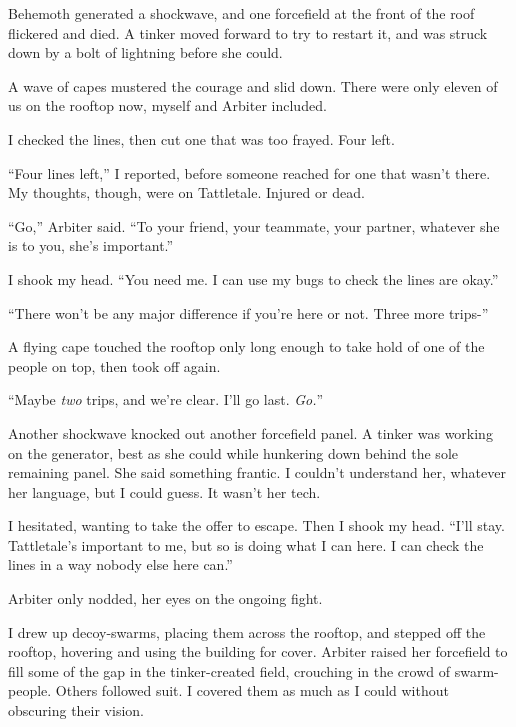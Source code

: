 Behemoth generated a shockwave, and one forcefield at the front of the roof flickered and died.  A tinker moved forward to try to restart it, and was struck down by a bolt of lightning before she could.



A wave of capes mustered the courage and slid down.  There were only eleven of us on the rooftop now, myself and Arbiter included.



I checked the lines, then cut one that was too frayed.  Four left.



``Four lines left,'' I reported, before someone reached for one that wasn't there.  My thoughts, though, were on Tattletale.  Injured or dead.



``Go,'' Arbiter said.  ``To your friend, your teammate, your partner, whatever she is to you, she's important.''



I shook my head.  ``You need me.  I can use my bugs to check the lines are okay.''



``There won't be any major difference if you're here or not.  Three more trips-''



A flying cape touched the rooftop only long enough to take hold of one of the people on top, then took off again.



``Maybe \emph{two }trips, and we're clear.  I'll go last.  \emph{Go}\emph{.}''



Another shockwave knocked out another forcefield panel.  A tinker was working on the generator, best as she could while hunkering down behind the sole remaining panel.  She said something frantic.  I couldn't understand her, whatever her language, but I could guess.  It wasn't her tech.



I hesitated, wanting to take the offer to escape.  Then I shook my head.  ``I'll stay.  Tattletale's important to me, but so is doing what I can here.  I can check the lines in a way nobody else here can.''



Arbiter only nodded, her eyes on the ongoing fight.



I drew up decoy-swarms, placing them across the rooftop, and stepped off the rooftop, hovering and using the building for cover.  Arbiter raised her forcefield to fill some of the gap in the tinker-created field, crouching in the crowd of swarm-people.  Others followed suit.  I covered them as much as I could without obscuring their vision.



